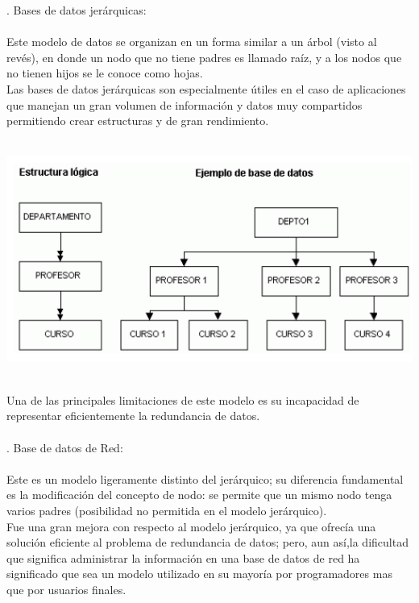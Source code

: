 \documentclass[12pt,letterpaper]{article}
\begin{document}
. Bases de datos jerárquicas: \\ \\

Este modelo de datos se organizan en un forma similar a un árbol (visto al revés), en donde un nodo que no tiene padres es llamado raíz, y a los nodos que no tienen hijos se le conoce como hojas. \\
Las bases de datos jerárquicas son especialmente útiles en el caso de aplicaciones que manejan un gran volumen de información y datos muy compartidos permitiendo crear estructuras y de gran rendimiento. \\ \\

\begin{center} 
\includegraphics[scale=1]{IMAGENES/jerarquica.png} 
\end{center}
\\
Una de las principales limitaciones  de este modelo es su incapacidad de representar eficientemente la redundancia de datos.  \\ \\
. Base de datos de Red: \\ \\
Este es un modelo ligeramente distinto del jerárquico; su diferencia fundamental es la modificación del concepto de nodo: se permite que un mismo nodo tenga varios padres (posibilidad  no permitida en el modelo jerárquico). \\
Fue una gran mejora con respecto al modelo jerárquico, ya que ofrecía una solución eficiente al problema de redundancia de datos; pero, aun así,la dificultad que significa administrar la información en una base de datos de red ha significado que sea un modelo utilizado en su mayoría por programadores mas que por usuarios finales. \\ \\
\end{document}
